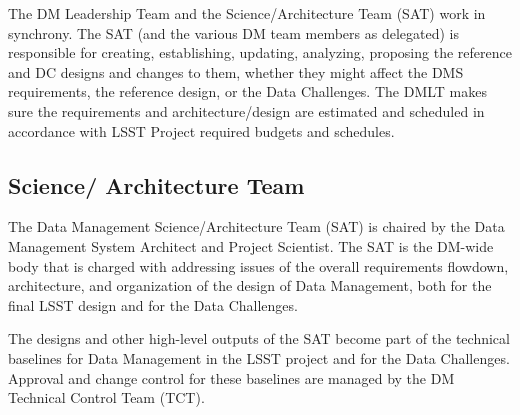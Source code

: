 The DM Leadership Team and the Science/Architecture Team (SAT) work in synchrony. The SAT (and the various DM team members as delegated) is responsible for creating, establishing, updating, analyzing, proposing the reference and DC designs and changes to them, whether they might affect the DMS requirements, the reference design, or the Data Challenges. The DMLT makes sure the requirements and architecture/design are estimated and scheduled in accordance with LSST Project required budgets and schedules.
\subsection{Science/ Architecture Team}

The Data Management Science/Architecture Team (SAT) is chaired by the Data Management System Architect and Project Scientist. The SAT is the DM-wide body that is charged with addressing issues of the overall requirements flowdown, architecture, and organization of the design of Data Management, both for the final LSST design and for the Data Challenges.

The designs and other high-level outputs of the SAT become part of the technical baselines for Data Management in the LSST project and for the Data Challenges. Approval and change control for these baselines are managed by the DM Technical Control Team (TCT).

